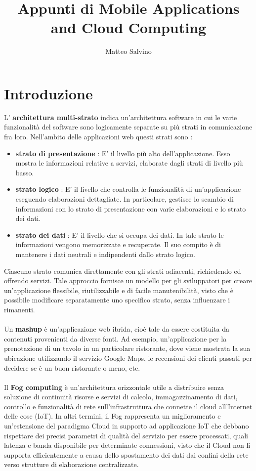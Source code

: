 \documentclass[12pt]{report}
\title{Appunti di Mobile Applications and Cloud Computing}
\author{Matteo Salvino}
\date{}
\begin{document}
\maketitle
\tableofcontents
\pagebreak

\chapter{Introduzione}
L' \textbf{architettura multi-strato} indica un'architettura software in cui le varie funzionalità del software sono logicamente separate su più strati in comunicazione fra loro. Nell'ambito delle applicazioni web questi strati sono :
\begin{itemize}
\item \textbf{strato di presentazione} : E' il livello più alto dell'applicazione. Esso mostra le informazioni relative a servizi, elaborate dagli strati di livello più basso.
\item \textbf{strato logico} : E' il livello che controlla le funzionalità di un'applicazione eseguendo elaborazioni dettagliate. In particolare, gestisce lo scambio di informazioni con lo strato di presentazione con varie elaborazioni e lo strato dei dati.
\item \textbf{strato dei dati} : E' il livello che si occupa dei dati. In tale strato le informazioni vengono memorizzate e recuperate. Il suo compito è di mantenere i dati neutrali e indipendenti dallo strato logico.
\end{itemize}
Ciascuno strato comunica direttamente con gli strati adiacenti, richiedendo ed offrendo servizi. Tale approccio fornisce un modello per gli sviluppatori per creare un'applicazione flessibile, riutilizzabile e di facile manutenibilità, visto che è possibile modificare separatamente uno specifico strato, senza influenzare i rimanenti.\\\\Un \textbf{mashup} è un'applicazione web ibrida, cioè tale da essere costituita da contenuti provenienti da diverse fonti. Ad esempio, un'applicazione per la prenotazione di un tavolo in un particolare ristorante, dove viene mostrata la sua ubicazione utilizzando il servizio Google Maps, le recensioni dei clienti passati per decidere se è un buon ristorante o meno, etc.\\\\Il \textbf{Fog computing} è un'architettura orizzontale utile a distribuire senza soluzione di continuità risorse e servizi di calcolo, immagazzinamento di dati, controllo e funzionalità di rete sull'infrastruttura che connette il cloud all'Internet delle cose (IoT). In altri termini, il Fog rappresenta un miglioramento e un'estensione del paradigma Cloud in supporto ad applicazione IoT che debbano rispettare dei precisi parametri di qualità del servizio per essere processati, quali latenza e banda disponibile per determinate connessioni, visto che il Cloud non li supporta efficientemente a causa dello spostamento dei dati dai confini della rete verso strutture di elaborazione centralizzate. 
\end{document}
